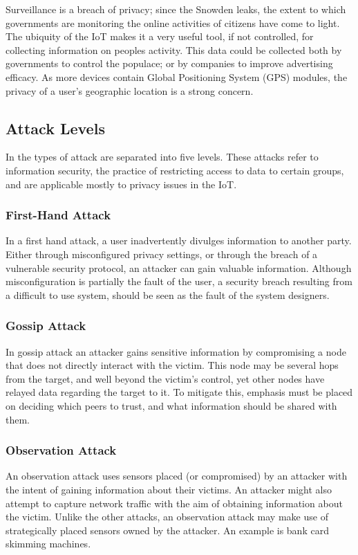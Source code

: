 \documentclass[10pt,journal,compsoc]{IEEEtran}
\begin{document}
Surveillance is a breach of privacy; since the Snowden leaks, the extent to
which governments are monitoring the online activities of citizens have come to
light. The ubiquity of the IoT makes it a very useful tool, if not controlled,
for collecting information on peoples activity\cite{Schneier2014}. This data
could be collected both by governments to control the populace; or by companies
to improve advertising efficacy. As more devices contain Global Positioning
System (GPS) modules, the privacy of a user's geographic location is a strong
concern.

\subsection{Attack Levels}
In \cite{Elkhodr2013} the types of attack are separated into five levels. These
attacks refer to information security, the practice of restricting access to
data to certain groups, and are applicable mostly to privacy issues in the IoT.

\subsubsection{First-Hand Attack}
In a first hand attack, a user inadvertently divulges information to another
party. Either through misconfigured privacy settings, or through the breach of
a vulnerable security protocol, an attacker can gain valuable information.
Although misconfiguration is partially the fault of the user, a security breach
resulting from a difficult to use system, should be seen as the fault of the
system designers. 

\subsubsection{Gossip Attack}
In gossip attack an attacker gains sensitive information by compromising a node
that does not directly interact with the victim. This node may be several hops
from the target, and well beyond the victim's control, yet other nodes have
relayed data regarding the target to it. To mitigate this, emphasis must be
placed on deciding which peers to trust, and what information should be shared
with them.

\subsubsection{Observation Attack}
An observation attack uses sensors placed (or compromised) by an
attacker with the intent of gaining information about their victims. An
attacker might also attempt to capture network traffic with the aim of
obtaining information about the victim. Unlike the other attacks, an
observation attack may make use of strategically placed sensors owned by the
attacker. An example is bank card skimming machines. 
\end{document}
